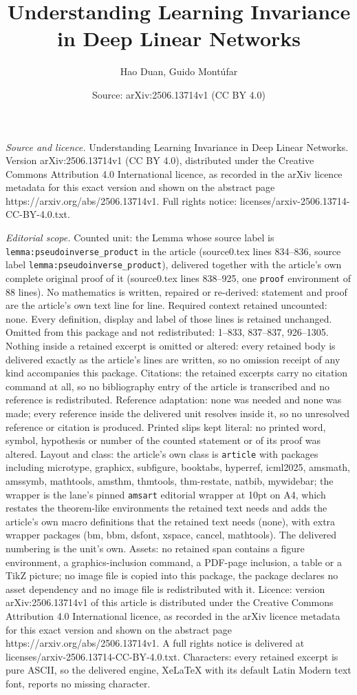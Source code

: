 \documentclass[10pt,a4paper]{amsart}
\title[Understanding Learning Invariance in Deep Linear Networks]{Understanding Learning Invariance in Deep Linear Networks}
\author{Hao Duan, Guido Mont\'ufar}
\date{Source: arXiv:2506.13714v1 (CC BY 4.0)}
\begin{document}
\maketitle

\noindent\emph{Source and licence.} Understanding Learning Invariance in Deep Linear Networks. Version arXiv:2506.13714v1 (CC BY 4.0), distributed under the Creative Commons Attribution 4.0 International licence, as recorded in the arXiv licence metadata for this exact version and shown on the abstract page https://arxiv.org/abs/2506.13714v1. Full rights notice: licenses/arxiv-2506.13714-CC-BY-4.0.txt.\par\smallskip

\noindent\textit{Editorial scope.} Counted unit: the Lemma whose source label is \texttt{lemma:pseudoinverse\_product} in the article (source0.tex lines 834--836, source label \texttt{lemma:pseudoinverse\_product}), delivered together with the article's own complete original proof of it (source0.tex lines 838--925, one \texttt{proof} environment of 88 lines). No mathematics is written, repaired or re-derived: statement and proof are the article's own text line for line. Required context retained uncounted: none. Every definition, display and label of those lines is retained unchanged. Omitted from this package and not redistributed: 1--833, 837--837, 926--1305. Nothing inside a retained excerpt is omitted or altered: every retained body is delivered exactly as the article's lines are written, so no omission receipt of any kind accompanies this package. Citations: the retained excerpts carry no citation command at all, so no bibliography entry of the article is transcribed and no reference is redistributed. Reference adaptation: none was needed and none was made; every reference inside the delivered unit resolves inside it, so no unresolved reference or citation is produced. Printed slips kept literal: no printed word, symbol, hypothesis or number of the counted statement or of its proof was altered. Layout and class: the article's own class is \texttt{article} with packages including microtype, graphicx, subfigure, booktabs, hyperref, icml2025, amsmath, amssymb, mathtools, amsthm, thmtools, thm-restate, natbib, mywidebar; the wrapper is the lane's pinned \texttt{amsart} editorial wrapper at 10pt on A4, which restates the theorem-like environments the retained text needs and adds the article's own macro definitions that the retained text needs (none), with extra wrapper packages (bm, bbm, dsfont, xspace, cancel, mathtools). The delivered numbering is the unit's own. Assets: no retained span contains a figure environment, a graphics-inclusion command, a PDF-page inclusion, a table or a TikZ picture; no image file is copied into this package, the package declares no asset dependency and no image file is redistributed with it. Licence: version arXiv:2506.13714v1 of this article is distributed under the Creative Commons Attribution 4.0 International licence, as recorded in the arXiv licence metadata for this exact version and shown on the abstract page https://arxiv.org/abs/2506.13714v1. A full rights notice is delivered at licenses/arxiv-2506.13714-CC-BY-4.0.txt. Characters: every retained excerpt is pure ASCII, so the delivered engine, XeLaTeX with its default Latin Modern text font, reports no missing character.
\end{document}
